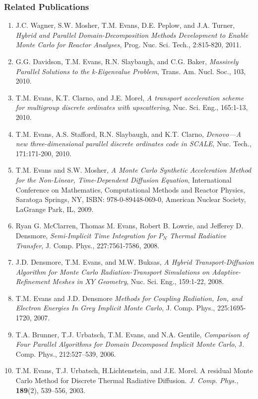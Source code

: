 \subsubsection*{Related Publications}
\begin{enumerate}
\parskip = -2pt

\item J.C. Wagner, S.W. Mosher, T.M. Evans, D.E. Peplow, and
  J.A. Turner, {\em Hybrid and Parallel Domain-Decomposition Methods Development to
  Enable Monte Carlo for Reactor Analyses,} {Prog. Nuc. Sci. Tech.},
  {2}:815-820, 2011.
\item G.G. Davidson, T.M. Evans, R.N. Slaybaugh, and C.G. Baker, {\em Massively
  Parallel Solutions to the k-Eigenvalue Problem},
  {Trans. Am. Nucl. Soc.}, {103}, 2010.
\item T.M. Evans, K.T. Clarno, and J.E. Morel, {\em A transport acceleration
  scheme for multigroup discrete ordinates with
  upscattering}, {Nuc. Sci. Eng.}, { 165}:1-13, 2010.
\item T.M. Evans, A.S. Stafford, R.N. Slaybaugh, and K.T. Clarno, 
  {\em Denovo---A
  new three-dimensional parallel discrete ordinates code in
  SCALE}, {Nuc. Tech.}, { 171}:171-200, 2010.
\item T.M. Evans and S.W. Mosher, {\em A Monte Carlo Synthetic
  Acceleration Method for the Non-Linear, Time-Dependent Diffusion
  Equation},  {International Conference on Mathematics,
    Computational Methods and Reactor Physics}, Saratoga Springs, NY,
  ISBN: 978-0-89448-069-0, American Nuclear Society, LaGrange Park,
  IL, 2009.
\item Ryan G. McClarren, Thomas M. Evans, Robert B. Lowrie, and
  Jefferey D. Densmore, {\em Semi-Implicit Time Integration for $P_N$
  Thermal Radiative Transfer},  {J. Comp. Phys.}, 
  { 227}:7561-7586, 2008.
\item J.D. Densmore, T.M. Evans, and M.W. Buksas, {\em A Hybrid
  Transport-Diffusion Algorithm for Monte Carlo Radiation-Transport
  Simulations on Adaptive-Refinement Meshes in $XY$ Geometry},
  {Nuc. Sci. Eng.}, { 159}:1-22, 2008.
\item T.M. Evans and J.D. Densmore {\em Methods for Coupling Radiation,
  Ion, and Electron Energies In Grey Implicit Monte Carlo},
  {J. Comp. Phys.}, { 225}:1695-1720, 2007.
\item T.A. Brunner, T.J. Urbatsch, T.M. Evans, and N.A. Gentile,
  {\em Comparison of Four Parallel Algorithms for Domain Decomposed
  Implicit Monte Carlo}, {J. Comp. Phys.}, { 212}:527--539, 2006.
\item T.M. Evans, T.J. Urbatsch, H.Lichtenstein, and J.E. Morel. A
  residual Monte Carlo Method for Discrete Thermal Radiative
  Diffusion. \textit{J. Comp. Phys.}, {\bf 189}(2), 539--556, 2003.
\end{enumerate}

